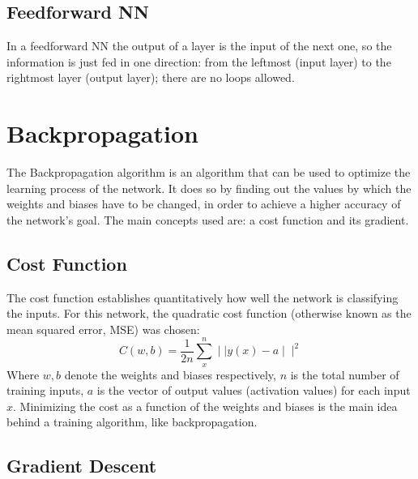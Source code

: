 \subsection*{Feedforward NN}\label{feedforwardNN}

 In a feedforward NN the output of a layer is the input of the next one, so the information is just fed in one direction: from the leftmost (input layer) to the rightmost layer (output layer); there are no loops allowed.

\section{Backpropagation}\label{backpTheo}

The Backpropagation algorithm is an algorithm that can be used to optimize the learning process of the network. It does so by finding out the values by which the weights and biases have to be changed, in order to achieve a higher accuracy of the network's goal. The main concepts used are: a cost function and its gradient.

\subsection{Cost Function}\label{costFuncTheo}

The cost function establishes quantitatively how well the network is classifying the inputs. For this network, the quadratic cost function (otherwise known as the mean squared error, MSE) was chosen:
\begin{equation}
    C(w,b) = \frac{1}{2 n} \sum^n_x \mid \mid y(x) - a \mid \mid ^2
\end{equation}
Where $w,b$ denote the weights and biases respectively, $n$ is the total number of training inputs, $a$ is the vector of output values (activation values) for each input $x$. Minimizing the cost as a function of the weights and biases is the main idea behind a training algorithm, like backpropagation.

\subsection{Gradient Descent}\label{gradDescTheo}

